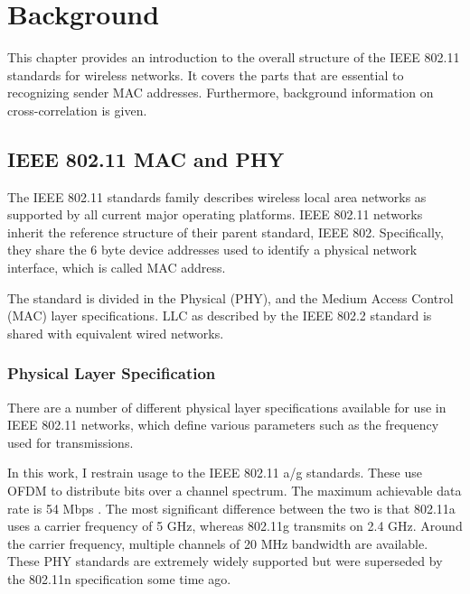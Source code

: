 
\chapter{Background}\label{ch:relatedwork}
\glsresetall %

This chapter provides an introduction to the overall structure of the \gls{IEEE} 802.11 standards for wireless networks. It covers the parts that are essential to recognizing sender \gls{MAC} addresses. Furthermore, background information on cross-correlation is given.



\section{IEEE 802.11 MAC and PHY} \label{sec:mac-and-phy}

The \gls{IEEE} 802.11 standards family describes wireless local area networks as supported by all current major operating platforms. \gls{IEEE} 802.11 networks inherit the reference structure of their parent standard, \gls{IEEE} 802. Specifically, they share the 6 byte device addresses used to identify a physical network interface, which is called \gls{MAC} address.

The standard is divided in the Physical (PHY), and the Medium Access Control (MAC) layer specifications. \gls{LLC} as described by the \gls{IEEE} 802.2 standard is shared with equivalent wired networks.


\subsection{Physical Layer Specification}

There are a number of different physical layer specifications available for use in \gls{IEEE} 802.11 networks, which define various parameters such as the frequency used for transmissions.

In this work, I restrain usage to the \gls{IEEE} 802.11 a/g standards. These use \gls{OFDM} to distribute bits over a channel spectrum. The maximum achievable data rate is 54 \gls{Mbps} \cite{ieee2012}. The most significant difference between the two is that 802.11a uses a carrier frequency of 5 GHz, whereas 802.11g transmits on 2.4 GHz. Around the carrier frequency, multiple channels of 20 MHz bandwidth are available. These \gls{PHY} standards are extremely widely supported but were superseded by the 802.11n specification some time ago.

